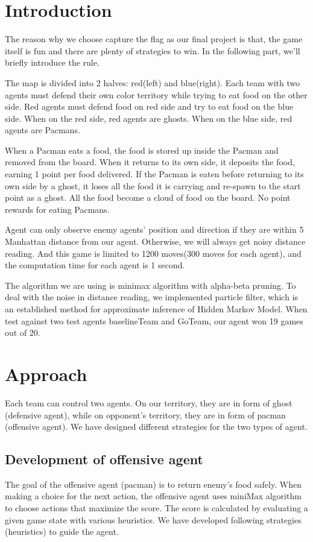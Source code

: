 \section{Introduction}
The reason why we choose capture the flag as our final project
is that, the game itself is fun and there are plenty of strategies
to win. In the following part, we'll briefly introduce the rule.

The map is divided into 2 halves: red(left) and blue(right). 
Each team with two agents must defend their own color territory while trying to eat food on the other side.
Red agents must defend food on red side and try to 
eat food on the blue side.  When on the red side, red agents are ghosts. When on the blue side,
red agents are Pacmans.

When a Pacman eats a food, the food is stored up inside the Pacman and removed
from the board.  When it returns to its own side, it deposits the food, earning 
1 point per food delivered.  If the Pacman is eaten before returning to its own side by a ghost, it loses all the food 
it is carrying and re-spawn to the start point as a ghost.  All the food become 
a cloud of food on the board.  No point rewards for eating Pacmans. 

Agent can only observe enemy 
agents’ position and direction if they are within 5 Manhattan distance from our agent. 
Otherwise, we will always get noisy distance reading. And this game is limited to 1200 
moves(300 moves for each agent), and the computation 
time for each agent is 1 second. 

The algorithm we are using is minimax algorithm with alpha-beta pruning. 
To deal with the noise in distance reading, we implemented particle filter, 
which is an established method for approximate inference of Hidden Markov Model. 
When test against two test agents baselineTeam and GoTeam, our agent won 19 games out of 20. 


\section{Approach}
Each team can control two agents. On our territory, they are in form of ghost (defensive agent), 
while on opponent's territory, they are in form of pacman (offensive agent). 
We have designed different strategies for the two types of agent.

\subsection{Development of offensive agent}
The goal of the offensive agent (pacman) is to return enemy's food safely. 
When making a choice for the next action, the offensive agent uses miniMax 
algorithm to choose actions that maximize the score. The score is calculated 
by evaluating a given game state with various heuristics. We have developed 
following strategies (heuristics) to guide the agent.


